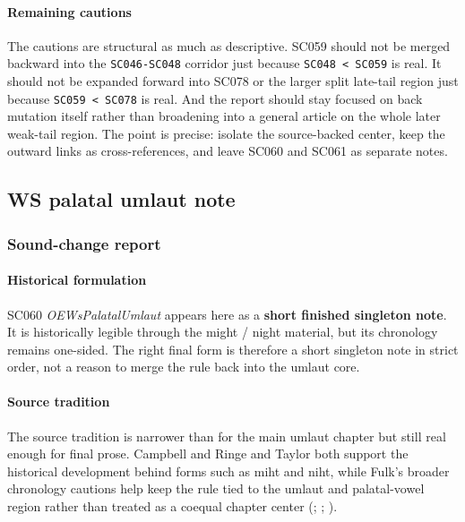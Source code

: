 \documentclass[
  british,
  a4paper,
]{article}
\begin{document}
\paragraph{Remaining cautions}\label{remaining-cautions-37}

The cautions are structural as much as descriptive. SC059 should not be
merged backward into the \texttt{SC046-SC048} corridor just because
\texttt{SC048\ \textless{}\ SC059} is real. It should not be expanded
forward into SC078 or the larger split late-tail region just because
\texttt{SC059\ \textless{}\ SC078} is real. And the report should stay
focused on back mutation itself rather than broadening into a general
article on the whole later weak-tail region. The point is precise:
isolate the source-backed center, keep the outward links as
cross-references, and leave SC060 and SC061 as separate notes.

\subsection{WS palatal umlaut note}\label{ws-palatal-umlaut-note}

\subsubsection{Sound-change report}\label{sound-change-report-38}

\paragraph{Historical formulation}\label{historical-formulation-38}

SC060 \emph{OEWsPalatalUmlaut} appears here as a \textbf{short finished
singleton note}. It is historically legible through the might / night
material, but its chronology remains one-sided. The right final form is
therefore a short singleton note in strict order, not a reason to merge
the rule back into the umlaut core.

\paragraph{Source tradition}\label{source-tradition-38}

The source tradition is narrower than for the main umlaut chapter but
still real enough for final prose. Campbell and Ringe and Taylor both
support the historical development behind forms such as miht and niht,
while Fulk's broader chronology cautions help keep the rule tied to the
umlaut and palatal-vowel region rather than treated as a coequal chapter
center (;
; ).
\end{document}
